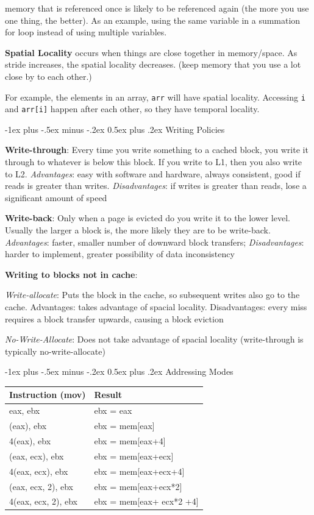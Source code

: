 \documentclass[10pt,landscape]{article}
\makeatletter
\renewcommand{\section}{\@startsection{section}{1}{0mm}%
                                {-1ex plus -.5ex minus -.2ex}%
                                {0.5ex plus .2ex}%
                                {\normalfont\large\bfseries}}
\makeatother
\begin{document}
\begin{multicols}{3}
memory that is referenced once is likely to be referenced again (the more you use one thing, the better). As an example, 
using the same variable in a summation for loop instead of using multiple variables. 

{\bf Spatial Locality} occurs when things are close together in
memory/space. As stride increases, the spatial locality
decreases. (keep memory that you use a lot close by to each other.)

For example, the elements in an array, \texttt{arr} will have spatial locality.
Accessing \texttt{i} and \texttt{arr[i]} happen after each other, so they have
temporal locality.

\section{Writing Policies}

{\bf Write-through}: Every time you write something to a cached block, you write it through to whatever is below this block. If you write to L1, then you also  write to L2. \emph{Advantages}: easy with software and hardware, always consistent, good if reads is greater than writes. \emph{Disadvantages}: if writes is greater than reads, lose a significant amount of speed

{\bf Write-back}: Only when a page is evicted do you write it to the lower level. Usually the larger a block is, the more likely they are to be write-back. \emph{Advantages}: faster, smaller number of downward block transfers; \emph{Disadvantages}: harder to implement, greater possibility of data inconsistency

{\bf Writing to blocks not in cache}: 

\emph{Write-allocate}: Puts the block in the cache, so subsequent writes also go to the cache. Advantages: takes advantage of spacial locality. Disadvantages: every miss requires a block transfer upwards, causing a block eviction

\emph{No-Write-Allocate}: Does not take advantage of spacial locality (write-through is typically no-write-allocate)

\section{Addressing Modes}

\begin{tabular}{|p{2.55cm}|p{3.65cm}|}
\hline
{\bf Instruction} (mov) & {\bf Result} \\\hline
eax, ebx & ebx = eax \\
(eax), ebx & ebx = mem[eax] \\
4(eax), ebx & ebx = mem[eax+4] \\
(eax, ecx), ebx & ebx = mem[eax+ecx] \\
4(eax, ecx), ebx & ebx = mem[eax+ecx+4] \\
(eax, ecx, 2), ebx & ebx = mem[eax+ecx*2] \\
4(eax, ecx, 2), ebx & ebx = mem[eax+ ecx*2 +4] \\\hline
\end{tabular}


\end{multicols}
\end{document}

